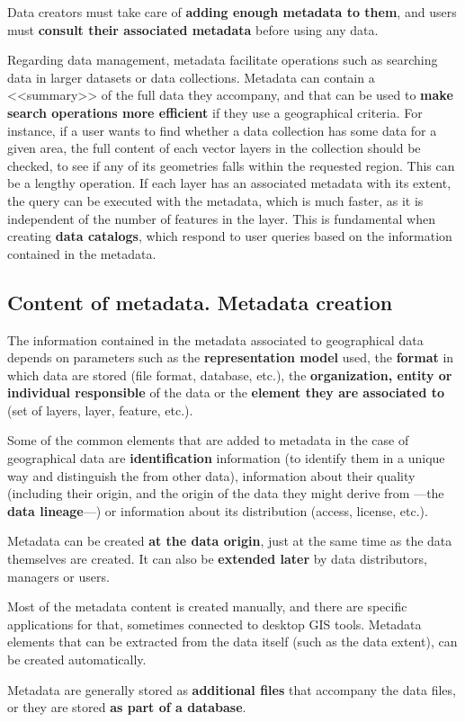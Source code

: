 Data creators must take care of \textbf{adding enough metadata to them}, and users must \textbf{consult their associated metadata} before using any data.

Regarding data management, metadata facilitate operations such as searching data in larger datasets or data collections. Metadata can contain a <<summary>> of the full data they accompany, and that can be used to \textbf{make search operations more efficient} if they use a geographical criteria. For instance, if a user wants to find whether a data collection has some data for a given area, the full content of each vector layers in the collection should be checked, to see if any of its geometries falls within the requested region. This can be a lengthy operation. If each layer has an associated metadata with its extent, the query can be executed with the metadata, which is much faster, as it is independent of the number of features in the layer. This is fundamental when creating \textbf{data catalogs}, which respond to user queries based on the information contained in the metadata.


\subsection{Content of metadata. Metadata creation}

The information contained in the metadata associated to geographical data depends on parameters such as the \textbf{representation model} used, the \textbf{format} in which data are stored (file format, database, etc.), the \textbf{organization, entity or individual responsible} of the data or the \textbf{element they are associated to} (set of layers, layer, feature, etc.).

Some of the common elements that are added to metadata in the case of geographical data are \textbf{identification} information (to identify them in a unique way and distinguish the from other data), information about their quality (including their origin, and the origin of the data they might derive from ---the \textbf{data lineage}---) or information about its distribution (access, license, etc.).
 
Metadata can be created \textbf{at the data origin}, just at the same time as the data themselves are created. It can also be \textbf{extended later} by data distributors, managers or users.

Most of the metadata content is created manually, and there are specific applications for that, sometimes connected to desktop GIS tools. Metadata elements that can be extracted from the data itself (such as the data extent), can be created automatically.

Metadata are generally stored as \textbf{additional files} that accompany the data files, or they are stored \textbf{as part of a database}.


\pagestyle{empty}
